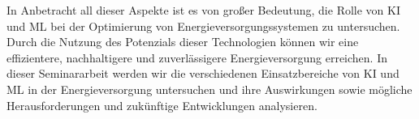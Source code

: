 In Anbetracht all dieser Aspekte ist es von großer Bedeutung, die Rolle von KI
und ML bei der Optimierung von Energieversorgungssystemen zu untersuchen. Durch
die Nutzung des Potenzials dieser Technologien können wir eine effizientere,
nachhaltigere und zuverlässigere Energieversorgung erreichen. In dieser
Seminararbeit werden wir die verschiedenen Einsatzbereiche von KI und ML in der
Energieversorgung untersuchen und ihre Auswirkungen sowie mögliche
Herausforderungen und zukünftige Entwicklungen analysieren.